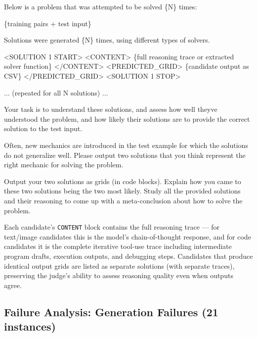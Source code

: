 \documentclass[10pt]{article}
\newenvironment{Shaded}{}{}
\newcommand{\NormalTok}[1]{#1}
\begin{document}
\begin{Shaded}
\begin{Highlighting}[]
\NormalTok{Below is a problem that was attempted to be solved \{N\} times:}

\NormalTok{\{training pairs + test input\}}

\NormalTok{Solutions were generated \{N\} times, using different types of solvers.}

\NormalTok{\textless{}SOLUTION 1 START\textgreater{}}
\NormalTok{\textless{}CONTENT\textgreater{}}
\NormalTok{\{full reasoning trace or extracted solver function\}}
\NormalTok{\textless{}/CONTENT\textgreater{}}
\NormalTok{\textless{}PREDICTED\_GRID\textgreater{}}
\NormalTok{\{candidate output as CSV\}}
\NormalTok{\textless{}/PREDICTED\_GRID\textgreater{}}
\NormalTok{\textless{}SOLUTION 1 STOP\textgreater{}}

\NormalTok{... (repeated for all N solutions) ...}

\NormalTok{Your task is to understand these solutions, and assess how well they\textquotesingle{}ve}
\NormalTok{understood the problem, and how likely their solutions are to provide the}
\NormalTok{correct solution to the test input.}

\NormalTok{Often, new mechanics are introduced in the test example for which the}
\NormalTok{solutions do not generalize well. Please output two solutions that you}
\NormalTok{think represent the right mechanic for solving the problem.}

\NormalTok{Output your two solutions as grids (in code blocks). Explain how you}
\NormalTok{came to these two solutions being the two most likely. Study all the}
\NormalTok{provided solutions and their reasoning to come up with a meta{-}conclusion}
\NormalTok{about how to solve the problem.}
\end{Highlighting}
\end{Shaded}

Each candidate's \texttt{CONTENT} block contains the full reasoning
trace --- for text/image candidates this is the model's chain-of-thought
response, and for code candidates it is the complete iterative tool-use
trace including intermediate program drafts, execution outputs, and
debugging steps. Candidates that produce identical output grids are
listed as separate solutions (with separate traces), preserving the
judge's ability to assess reasoning quality even when outputs agree.

\hypertarget{failure-analysis-generation-failures-21-instances}{%
\subsection{Failure Analysis: Generation Failures (21
instances)}\label{failure-analysis-generation-failures-21-instances}}
\end{document}
